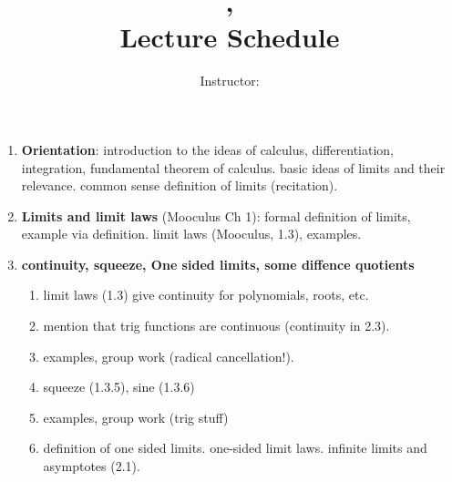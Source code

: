 \documentclass[12pt]{amsart}
\title{\course, \semester \\ Lecture Schedule}
\author{Instructor: \instructor}
\begin{document}
\maketitle

\begin{enumerate}[1. ]

\item \textbf{Orientation}: introduction to the ideas of calculus, differentiation,
integration, fundamental theorem of calculus. basic ideas of limits and
their relevance. common sense definition of limits (recitation).
\item \textbf{Limits and limit laws} (Mooculus Ch 1): formal definition of
limits, example via definition. limit laws (Mooculus, 1.3), examples.
\item \textbf{continuity, squeeze, One sided limits, some diffence
quotients} 
\begin{enumerate}[ \ \  i. ]
\item
limit laws (1.3) give continuity for polynomials, roots, etc. 
\item
mention that trig functions are continuous (continuity in 2.3).
\item
examples, group work (radical cancellation!).
\item
squeeze (1.3.5), sine (1.3.6)
\item
examples, group work (trig stuff)
\item
definition of one sided limits. one-sided limit laws. infinite limits and
asymptotes (2.1).
\end{enumerate}

\end{enumerate}
\end{document}

